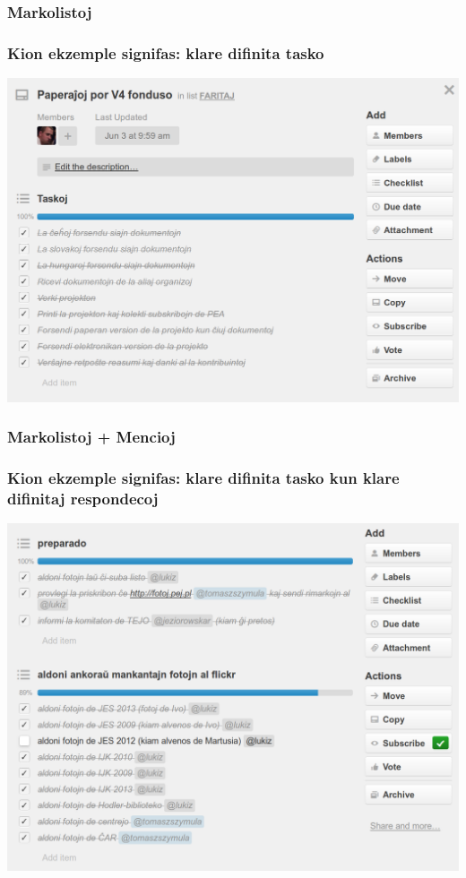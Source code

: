   \begin{frame}
    \frametitle{Markolistoj}
    \frametitle{Kion ekzemple signifas: klare difinita tasko}
		
		\begin{center}
		\includegraphics[scale=0.222]{ekranoj/markolistoj}
		\end{center}
	
  \end{frame}


  \begin{frame}
    \frametitle{Markolistoj + Mencioj}
    \frametitle{Kion ekzemple signifas: klare difinita tasko kun klare difinitaj respondecoj}
    
	\begin{center}
		\includegraphics[scale=0.175]{ekranoj/markolistoj-kun-mencioj}
	\end{center}
	
  \end{frame}

